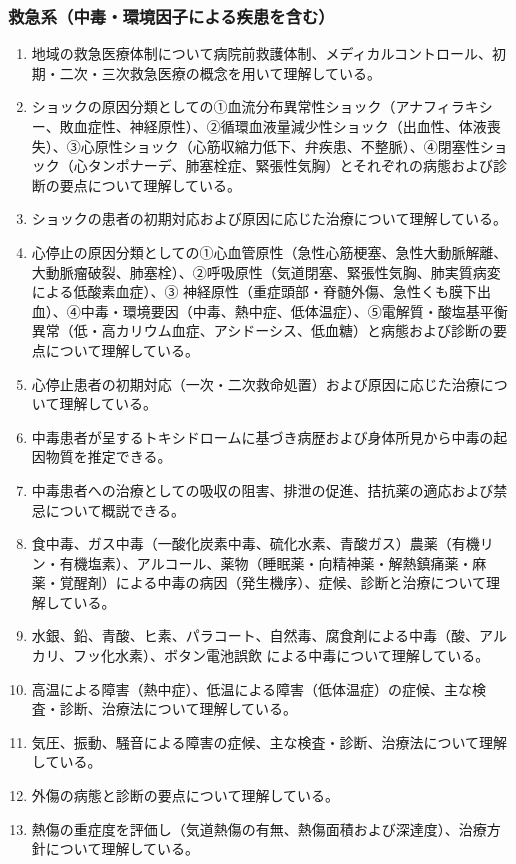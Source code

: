 \hypertarget{ux6551ux6025ux7cfbux4e2dux6bd2ux74b0ux5883ux56e0ux5b50ux306bux3088ux308bux75beux60a3ux3092ux542bux3080}{%
\subsubsection{救急系（中毒・環境因子による疾患を含む）}\label{ux6551ux6025ux7cfbux4e2dux6bd2ux74b0ux5883ux56e0ux5b50ux306bux3088ux308bux75beux60a3ux3092ux542bux3080}}

\begin{enumerate}
\def\labelenumi{\arabic{enumi}.}
\tightlist
\item
  地域の救急医療体制について病院前救護体制、メディカルコントロール、初期・二次・三次救急医療の概念を用いて理解している。
\item
  ショックの原因分類としての①血流分布異常性ショック（アナフィラキシー、敗血症性、神経原性）、②循環血液量減少性ショック（出血性、体液喪失）、③心原性ショック（心筋収縮力低下、弁疾患、不整脈）、④閉塞性ショック（心タンポナーデ、肺塞栓症、緊張性気胸）とそれぞれの病態および診断の要点について理解している。
\item
  ショックの患者の初期対応および原因に応じた治療について理解している。
\item
  心停止の原因分類としての①心血管原性（急性心筋梗塞、急性大動脈解離、大動脈瘤破裂、肺塞栓）、②呼吸原性（気道閉塞、緊張性気胸、肺実質病変による低酸素血症）、③
  神経原性（重症頭部・脊髄外傷、急性くも膜下出血）、④中毒・環境要因（中毒、熱中症、低体温症）、⑤電解質・酸塩基平衡異常（低・高カリウム血症、アシドーシス、低血糖）と病態および診断の要点について理解している。
\item
  心停止患者の初期対応（一次・二次救命処置）および原因に応じた治療について理解している。
\item
  中毒患者が呈するトキシドロームに基づき病歴および身体所見から中毒の起因物質を推定できる。
\item
  中毒患者への治療としての吸収の阻害、排泄の促進、拮抗薬の適応および禁忌について概説できる。
\item
  食中毒、ガス中毒（一酸化炭素中毒、硫化水素、青酸ガス）農薬（有機リン・有機塩素）、アルコール、薬物（睡眠薬・向精神薬・解熱鎮痛薬・麻薬・覚醒剤）による中毒の病因（発生機序）、症候、診断と治療について理解している。
\item
  水銀、鉛、青酸、ヒ素、パラコート、自然毒、腐食剤による中毒（酸、アルカリ、フッ化水素）、ボタン電池誤飲
  による中毒について理解している。
\item
  高温による障害（熱中症）、低温による障害（低体温症）の症候、主な検査・診断、治療法について理解している。
\item
  気圧、振動、騒音による障害の症候、主な検査・診断、治療法について理解している。
\item
  外傷の病態と診断の要点について理解している。
\item
  熱傷の重症度を評価し（気道熱傷の有無、熱傷面積および深達度）、治療方針について理解している。
\end{enumerate}

